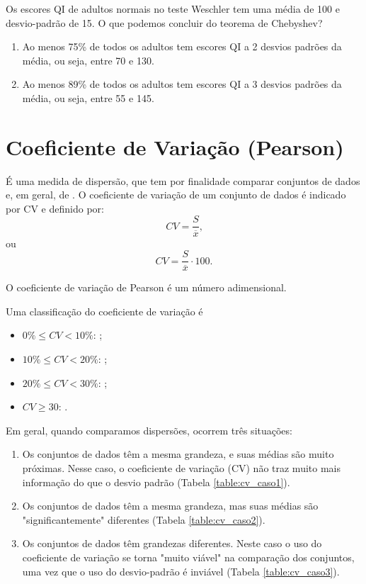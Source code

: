 \documentclass[11pt,fleqn]{book}
\numberwithin{mpicture}{chapter}
\numberwithin{mtable}{chapter}
\numberwithin{mframe}{chapter}
\begin{document}
\begin{example}
	Os escores QI de adultos normais no teste Weschler tem uma média de 100 e desvio-padrão de 15. O que podemos concluir do teorema de Chebyshev?
	
	\begin{enumerate}
		\item Ao menos 75\% de todos os adultos tem escores QI a 2 desvios padrões da média, ou seja, entre 70 e 130.
		
		\item Ao menos 89\% de todos os adultos tem escores QI a 3 desvios padrões da média, ou seja, entre 55 e 145.
	\end{enumerate}
\end{example}

\section{Coeficiente de Variação (Pearson)}

É uma medida de dispersão, que tem por finalidade comparar conjuntos de dados  e, em geral, de . O coeficiente de variação de um conjunto de dados é indicado por CV e definido por:
\begin{equation}
	CV=\frac{S}{\overline{x}}\text{,}
\end{equation}
ou
\begin{equation}
	CV=\frac{S}{\overline{x}}\cdot 100\text{.}
\end{equation}

O coeficiente de variação de Pearson é um número adimensional.

Uma classificação do coeficiente de variação é
\begin{itemize}
	\item $0\%\leqslant CV < 10\%$: ;
	\item $10\%\leqslant CV < 20\%$: ;
	\item $20\%\leqslant CV < 30\%$: ;
	\item $CV \geqslant 30$: .
\end{itemize}

Em geral, quando comparamos dispersões, ocorrem três situações:

\begin{enumerate}
	\item Os conjuntos de dados têm a mesma grandeza, e suas médias são muito próximas. Nesse caso, o coeficiente de variação (CV) não traz muito mais informação do que o desvio padrão (Tabela \ref{table:cv_caso1}).
	
	\item Os conjuntos de dados têm a mesma grandeza, mas suas médias são "significantemente" diferentes (Tabela \ref{table:cv_caso2}).
	
	\item Os conjuntos de dados têm grandezas diferentes. Neste caso o uso do coeficiente de variação se torna "muito viável" na comparação dos conjuntos, uma vez que o uso do desvio-padrão é inviável (Tabela \ref{table:cv_caso3}).
\end{enumerate}
\end{document}
